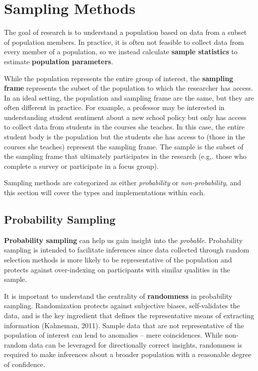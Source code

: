 \documentclass[
]{book}
\begin{document}
\hypertarget{sampling-methods}{%
\section{Sampling Methods}\label{sampling-methods}}

The goal of research is to understand a population based on data from a subset of population members. In practice, it is often not feasible to collect data from every member of a population, so we instead calculate \textbf{sample statistics} to estimate \textbf{population parameters}.

While the population represents the entire group of interest, the \textbf{sampling frame} represents the subset of the population to which the researcher has access. In an ideal setting, the population and sampling frame are the same, but they are often different in practice. For example, a professor may be interested in understanding student sentiment about a new school policy but only has access to collect data from students in the courses she teaches. In this case, the entire student body is the population but the students she has access to (those in the courses she teaches) represent the sampling frame. The sample is the subset of the sampling frame that ultimately participates in the research (e.g,. those who complete a survey or participate in a focus group).

Sampling methods are categorized as either \emph{probability} or \emph{non-probability}, and this section will cover the types and implementations within each.

\hypertarget{probability-sampling}{%
\subsection{Probability Sampling}\label{probability-sampling}}

\textbf{Probability sampling} can help us gain insight into the \emph{probable}. Probability sampling is intended to facilitate inferences since data collected through random selection methods is more likely to be representative of the population and protects against over-indexing on participants with similar qualities in the sample.

It is important to understand the centrality of \textbf{randomness} in probability sampling. Randomization protects against subjective biases, self-validates the data, and is the key ingredient that defines the representative means of extracting information (Kahneman, 2011). Sample data that are not representative of the population of interest can lend to anomalies -- mere coincidences. While non-random data can be leveraged for directionally correct insights, randomness is required to make inferences about a broader population with a reasonable degree of confidence.
\end{document}
